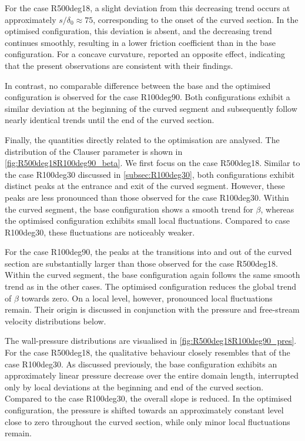 For the case R500deg18, a slight deviation from this decreasing trend occurs at approximately $s/\delta_0 \approx 75$, corresponding to the onset of the curved section.
In the optimised configuration, this deviation is absent, and the decreasing trend continues smoothly, resulting in a lower friction coefficient than in the base configuration. 
For a concave curvature, \citet{appelbaum_systematic_2025} reported an opposite effect, indicating that the present observations are consistent with their findings.

In contrast, no comparable difference between the base and the optimised configuration is observed for the case R100deg90. 
Both configurations exhibit a similar deviation at the beginning of the curved segment and subsequently follow nearly identical trends until the end of the curved section.


Finally, the quantities directly related to the optimisation are analysed.
The distribution of the Clauser parameter is shown in \autoref{fig:R500deg18R100deg90_beta}.
We first focus on the case R500deg18.
Similar to the case R100deg30 discussed in \autoref{subsec:R100deg30}, both configurations  exhibit distinct peaks at the entrance and exit of the curved  segment. However, these peaks are less pronounced than those observed for the case R100deg30. 
Within the curved segment, the base configuration shows a smooth trend for $\beta$, whereas the optimised configuration exhibits small local fluctuations.
Compared to case R100deg30, these fluctuations are noticeably weaker.

For the case R100deg90, the peaks at the transitions into and out of the curved section are substantially larger than those observed for the case R500deg18.  
Within the curved segment, the base configuration again follows the same smooth trend as in the other cases.
The optimised configuration reduces the global trend of $\beta$ towards zero. 
On a local level, however, pronounced local fluctuations remain. 
Their origin is discussed in conjunction with the pressure and free-stream velocity distributions below.

The wall-pressure distributions are visualised in \autoref{fig:R500deg18R100deg90_pres}.
For the case R500deg18, the qualitative behaviour closely resembles that of the case R100deg30. 
As discussed previously, the base configuration exhibits an approximately linear pressure decrease over the entire domain length, interrupted only by local deviations at the beginning and end of the curved section. 
Compared to the case R100deg30, the overall slope is reduced.
In the optimised configuration, the pressure is shifted towards an approximately constant level close to zero throughout the curved section, while only minor local fluctuations remain. 

